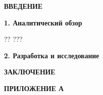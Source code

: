 \documentclass[
    candidate, %
    subf, %
]{disser}
\begin{document}


\renewcommand{\contentsname}{\centerline{\large СОДЕРЖАНИЕ}}
\tableofcontents

\newpage
\begin{center}
  \textbf{\large ВВЕДЕНИЕ}
\end{center}

\newpage
\begin{center}
  \textbf{\large 1. Аналитический обзор }
\end{center}

?? \cite{nakamoto2008bitcoin} ???

\newpage
\begin{center}
  \textbf{\large 2. Разработка и исследование }
\end{center}


\newpage
\begin{center}
  \textbf{\large ЗАКЛЮЧЕНИЕ}
\end{center}

\newpage
{} %
\renewcommand{\bibsection}{\centering\textbf{\large СПИСОК ИСПОЛЬЗОВАННЫХ ИСТОЧНИКОВ}} %



\newpage
\begin{center}
  \textbf{\large ПРИЛОЖЕНИЕ А}
\end{center}
\end{document}
